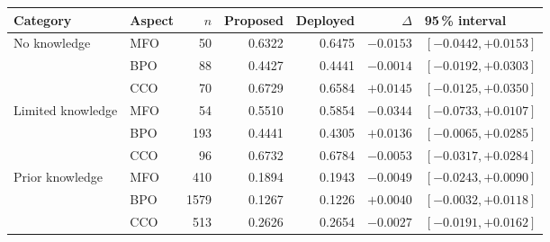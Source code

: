 \begin{tabular}{llrrrrl}
\toprule
    \textbf{Category} & \textbf{Aspect} & \textbf{$n$} & \textbf{Proposed} & \textbf{Deployed} & \textbf{$\Delta$} & \textbf{95\,\% interval} \\
\midrule
    No knowledge & MFO & 50 & 0.6322 & 0.6475 & $-0.0153$ & $[-0.0442, +0.0153]$ \\
     & BPO & 88 & 0.4427 & 0.4441 & $-0.0014$ & $[-0.0192, +0.0303]$ \\
     & CCO & 70 & 0.6729 & 0.6584 & $+0.0145$ & $[-0.0125, +0.0350]$ \\
\midrule
    Limited knowledge & MFO & 54 & 0.5510 & 0.5854 & $-0.0344$ & $[-0.0733, +0.0107]$ \\
     & BPO & 193 & 0.4441 & 0.4305 & $+0.0136$ & $[-0.0065, +0.0285]$ \\
     & CCO & 96 & 0.6732 & 0.6784 & $-0.0053$ & $[-0.0317, +0.0284]$ \\
\midrule
    Prior knowledge & MFO & 410 & 0.1894 & 0.1943 & $-0.0049$ & $[-0.0243, +0.0090]$ \\
     & BPO & 1579 & 0.1267 & 0.1226 & $+0.0040$ & $[-0.0032, +0.0118]$ \\
     & CCO & 513 & 0.2626 & 0.2654 & $-0.0027$ & $[-0.0191, +0.0162]$ \\
\bottomrule
\end{tabular}
